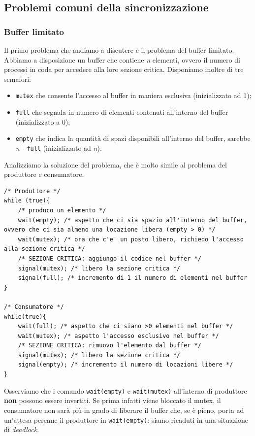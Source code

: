 \subsection{Problemi comuni della sincronizzazione}


\subsubsection{Buffer limitato}
Il primo problema che andiamo a discutere è il problema del buffer limitato. Abbiamo a disposizione un buffer che contiene \textit{n} elementi, ovvero il numero di processi in coda per accedere alla loro sezione critica. Disponiamo inoltre di tre semafori:
\vspace{-5px}
\begin{itemize}
\setlength{\itemsep}{-.15 em}
    \item \texttt{mutex} che consente l'accesso al buffer in maniera esclusiva (inizializzato ad 1);
    \item \texttt{full} che segnala in numero di elementi contenuti all'interno del buffer (inizializzato a 0);
    \item \texttt{empty} che indica la quantità di spazi disponibili all'interno del buffer, sarebbe \textit{n - }\texttt{full} (inizializzato ad \textit{n}).
\end{itemize}
Analizziamo la soluzione del problema, che è molto simile al problema del produttore e consumatore.
\begin{lstlisting}[caption = {Problema del buffer limitato}]
/* Produttore */
while (true){
    /* produco un elemento */
    wait(empty); /* aspetto che ci sia spazio all'interno del buffer, ovvero che ci sia almeno una locazione libera (empty > 0) */
    wait(mutex); /* ora che c'e' un posto libero, richiedo l'accesso alla sezione critica */
    /* SEZIONE CRITICA: aggiungo il codice nel buffer */
    signal(mutex); /* libero la sezione critica */
    signal(full); /* incremento di 1 il numero di elementi nel buffer
}

/* Consumatore */
while(true){
    wait(full); /* aspetto che ci siano >0 elementi nel buffer */
    wait(mutex); /* aspetto l'accesso esclusivo nel buffer */
    /* SEZIONE CRITICA: rimuovo l'elemento dal buffer */
    signal(mutex); /* libero la sezione critica */
    signal(empty); /* incremento il numero di locazioni libere */
}
\end{lstlisting}

Osserviamo che i comando \texttt{wait(empty)} e \texttt{wait(mutex)} all'interno di produttore \textbf{non} possono essere invertiti. Se prima infatti viene bloccato il mutex, il consumatore non sarà più in grado di liberare il buffer che, se è pieno, porta ad un'attesa perenne il produttore in \texttt{wait(empty)}: siamo ricaduti in una situazione di \textit{deadlock}.

